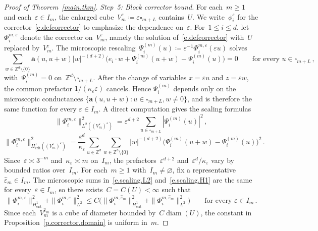 \documentclass[11pt]{amsart}
\theoremstyle{plain}
\theoremstyle{definition}
\theoremstyle{remark}
\newcommand{\Zd}{\mathbb{Z}^d}
\renewcommand{\a}{\mathbf{a}}
\newcommand{\cu}{\square}
\newcommand{\eps}{\varepsilon}
\begin{document}
\begin{proof}[Proof of Theorem~\ref{main.thm}]
		\smallskip
		
		\emph{Step~5: Block corrector bound.}
		For each~$m \ge 1$ and each~$\eps \in I_m$, the enlarged cube~$V_m^\eps \coloneqq \eps\cu_{m+L}$ contains~$U$.
		We write~$\phi_i^\eps$ for the corrector~\eqref{e.defcorrector} to emphasize the dependence on~$\eps$.
		For~$1 \le i \le d$, let~$\Phi_i^{m,\eps}$ denote the corrector on~$V_m^\eps$, namely the solution of~\eqref{e.defcorrector} with~$U$ replaced by~$V_m^\eps$.
		The microscopic rescaling~$\Psi_i^{(m)}(u) \coloneqq \eps^{-1}\Phi_i^{m,\eps}(\eps u)$ solves
		\begin{equation}
			\label{e.micro.corrector}
			\sum_{w \in \Zd \setminus \{0\}} \a(u, u{+}w) |w|^{-(d+2)} \bigl(e_i \cdot w + \Psi_i^{(m)}(u{+}w) - \Psi_i^{(m)}(u)\bigr) = 0
			\qquad \text{for every } u \in \cu_{m+L}\,,
		\end{equation}
		with~$\Psi_i^{(m)} = 0$ on~$\Zd \setminus \cu_{m+L}$.
		After the change of variables $x = \eps u$ and $z = \eps w$, the common prefactor $1/(\kappa_\eps\eps)$ cancels.
		Hence $\Psi_i^{(m)}$ depends only on the microscopic conductances $\{\a(u, u{+}w) : u \in \cu_{m+L},w \ne 0\}$, and is therefore the same function for every $\eps \in I_m$.
		A direct computation gives the scaling formulas
		\begin{equation}
			\label{e.scaling.L2}
			\|\Phi_i^{m,\eps}\|_{L^2((V_m^\eps)^\eps)}^2
			= \eps^{d+2}\sum_{u \in \cu_{m+L}} |\Psi_i^{(m)}(u)|^2\,,
		\end{equation}
		\begin{equation}
			\label{e.scaling.H1}
			\|\Phi_i^{m,\eps}\|_{H^1_{\mathrm{crit}}((V_m^\eps)^\eps)}^2
			= \frac{\eps^d}{\kappa_\eps}\sum_{u \in \Zd}\sum_{w \in \Zd \setminus \{0\}} |w|^{-(d+2)}\bigl(\Psi_i^{(m)}(u{+}w) - \Psi_i^{(m)}(u)\bigr)^2\,.
		\end{equation}
		Since~$\eps \asymp 3^{-m}$ and~$\kappa_\eps \asymp m$ on~$I_m$, the prefactors~$\eps^{d+2}$ and~$\eps^d/\kappa_\eps$ vary by bounded ratios over~$I_m$.
		For each~$m \ge 1$ with~$I_m \ne \varnothing$, fix a representative~$\widehat\eps_m \in I_m$.
		The microscopic sums in~\eqref{e.scaling.L2} and~\eqref{e.scaling.H1} are the same for every~$\eps \in I_m$, so there exists~$C = C(U) < \infty$ such that
		\[
		\|\Phi_i^{m,\eps}\|_{H^1_{\mathrm{crit}}}^2 + \|\Phi_i^{m,\eps}\|_{L^2}^2
		\le C\bigl(\|\Phi_i^{m,\widehat\eps_m}\|_{H^1_{\mathrm{crit}}}^2 + \|\Phi_i^{m,\widehat\eps_m}\|_{L^2}^2\bigr)
		\qquad \text{for every } \eps \in I_m\,.
		\]
		Since each~$V_m^{\widehat\eps_m}$ is a cube of diameter bounded by~$C\operatorname{diam}(U)$, the constant in Proposition~\ref{p.corrector.domain} is uniform in~$m$.

\end{proof}
\end{document}
